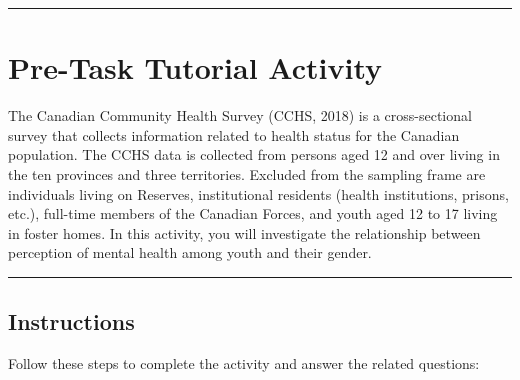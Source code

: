 \documentclass[oneside,openany]{book}
\begin{document}
\begin{center}\rule{0.5\linewidth}{0.5pt}\end{center}

\section{Pre-Task Tutorial Activity}\label{pre-task-tutorial-activity-5}

The Canadian Community Health Survey (CCHS, 2018) is a cross-sectional survey that collects information related to health status for the Canadian population. The CCHS data is collected from persons aged 12 and over living in the ten provinces and three territories. Excluded from the sampling frame are individuals living on Reserves, institutional residents (health institutions, prisons, etc.), full-time members of the Canadian Forces, and youth aged 12 to 17 living in foster homes. In this activity, you will investigate the relationship between perception of mental health among youth and their gender.

\begin{center}\rule{0.5\linewidth}{0.5pt}\end{center}

\subsection{Instructions}\label{instructions}

Follow these steps to complete the activity and answer the related questions:
\end{document}
